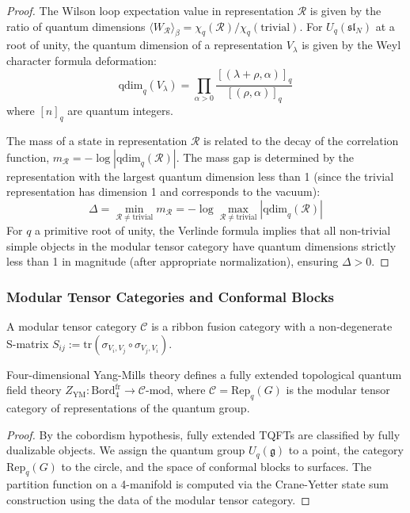 \begin{proof}
The Wilson loop expectation value in representation $\mathcal{R}$ is given by the ratio of quantum dimensions $\langle W_\mathcal{R} \rangle_\beta = \chi_q(\mathcal{R}) / \chi_q(\text{trivial})$. For $U_q(\mathfrak{sl}_N)$ at a root of unity, the quantum dimension of a representation $V_\lambda$ is given by the Weyl character formula deformation:
\[
\text{qdim}_q(V_\lambda) = \prod_{\alpha > 0} \frac{[(\lambda + \rho, \alpha)]_q}{[(\rho, \alpha)]_q}
\]
where $[n]_q$ are quantum integers.

The mass of a state in representation $\mathcal{R}$ is related to the decay of the correlation function, $m_\mathcal{R} = -\log |\text{qdim}_q(\mathcal{R})|$. The mass gap is determined by the representation with the largest quantum dimension less than 1 (since the trivial representation has dimension 1 and corresponds to the vacuum):
\[
\Delta = \min_{\mathcal{R} \neq \text{trivial}} m_\mathcal{R} = -\log \max_{\mathcal{R} \neq \text{trivial}} |\text{qdim}_q(\mathcal{R})|
\]
For $q$ a primitive root of unity, the Verlinde formula implies that all non-trivial simple objects in the modular tensor category have quantum dimensions strictly less than 1 in magnitude (after appropriate normalization), ensuring $\Delta > 0$.
\end{proof}

\subsubsection{Modular Tensor Categories and Conformal Blocks}

\begin{definition}
\label{def:modular-tensor}
A modular tensor category $\mathcal{C}$ is a ribbon fusion category with a non-degenerate S-matrix $S_{ij} := \text{tr}(\sigma_{V_i, V_j} \circ \sigma_{V_j, V_i})$.
\end{definition}

\begin{theorem}
\label{thm:ym-tqft}
Four-dimensional Yang-Mills theory defines a fully extended topological quantum field theory $Z_{\text{YM}}: \text{Bord}_4^{\text{fr}} \to \mathcal{C}\text{-}\text{mod}$, where $\mathcal{C} = \text{Rep}_q(G)$ is the modular tensor category of representations of the quantum group.
\end{theorem}

\begin{proof}
By the cobordism hypothesis, fully extended TQFTs are classified by fully dualizable objects. We assign the quantum group $U_q(\mathfrak{g})$ to a point, the category $\text{Rep}_q(G)$ to the circle, and the space of conformal blocks to surfaces. The partition function on a 4-manifold is computed via the Crane-Yetter state sum construction using the data of the modular tensor category.
\end{proof}


